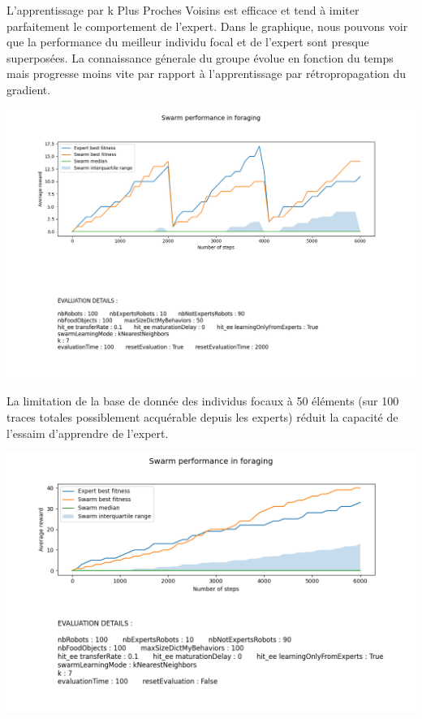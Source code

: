 \documentclass[a4paper, 12pt]{report}
\begin{document}
    L'apprentissage par k Plus Proches Voisins est efficace et tend à imiter parfaitement le comportement de l'expert.
    Dans le graphique, nous pouvons voir que la performance du meilleur individu focal et de l'expert sont presque superposées. La connaissance génerale du groupe évolue en fonction du temps mais progresse moins vite par rapport à l'apprentissage par rétropropagation du gradient.
    
    \includegraphics[scale=0.5]{knn6000_50.png}
    
    La limitation de la base de donnée des individus focaux à 50 éléments (sur 100 traces totales possiblement acquérable depuis les experts) réduit la capacité de l'essaim d'apprendre de l'expert. 
    
    
    \includegraphics[scale=0.5]{knn6000_100_noReset.png}
        
\end{document}
